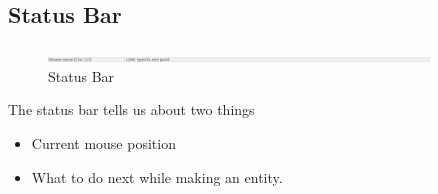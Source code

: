 \subsection{Status Bar}
\begin{figure}[h!]
\centering
\includegraphics[width=0.9\textwidth]{images/statusbar.png} 
\caption{Status Bar}
\end{figure}
The status bar tells us about two things
\begin{itemize}
\item Current mouse position
\item What to do next while making an entity.
\end{itemize}